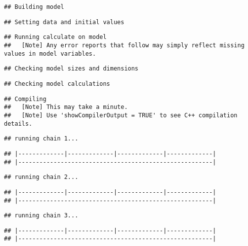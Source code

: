 \documentclass[
]{article}
\begin{document}
\begin{verbatim}
## Building model
\end{verbatim}

\begin{verbatim}
## Setting data and initial values
\end{verbatim}

\begin{verbatim}
## Running calculate on model
##   [Note] Any error reports that follow may simply reflect missing values in model variables.
\end{verbatim}

\begin{verbatim}
## Checking model sizes and dimensions
\end{verbatim}

\begin{verbatim}
## Checking model calculations
\end{verbatim}

\begin{verbatim}
## Compiling
##   [Note] This may take a minute.
##   [Note] Use 'showCompilerOutput = TRUE' to see C++ compilation details.
\end{verbatim}

\begin{verbatim}
## running chain 1...
\end{verbatim}

\begin{verbatim}
## |-------------|-------------|-------------|-------------|
## |-------------------------------------------------------|
\end{verbatim}

\begin{verbatim}
## running chain 2...
\end{verbatim}

\begin{verbatim}
## |-------------|-------------|-------------|-------------|
## |-------------------------------------------------------|
\end{verbatim}

\begin{verbatim}
## running chain 3...
\end{verbatim}

\begin{verbatim}
## |-------------|-------------|-------------|-------------|
## |-------------------------------------------------------|
\end{verbatim}
\end{document}
